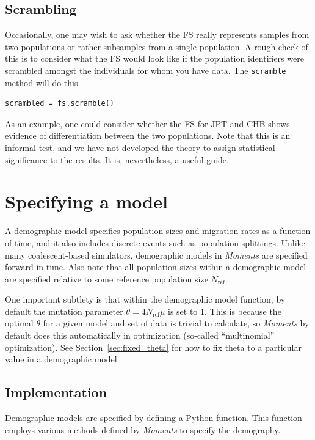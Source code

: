 \documentclass[12pt]{article}
\makeatletter
\newcommand{\Nref}{\ensuremath{N_\text{ref}}\xspace}
\newcommand{\py}[1]{\lstinline[language=Python, showstringspaces=False]@#1@}
\makeatother
\begin{document}
\subsection{Scrambling}

Occasionally, one may wish to ask whether the FS really represents samples from two populations or rather subsamples from a single population.
A rough check of this is to consider what the FS would look like if the population identifiers were scrambled amongst the individuals for whom you have data.
The \py{scramble} method will do this.
\begin{lstlisting}
scrambled = fs.scramble()
\end{lstlisting}
As an example, one could consider whether the FS for JPT and CHB shows evidence of differentiation between the two populations.
Note that this is an informal test, and we have not developed the theory to assign statistical significance to the results.
It is, nevertheless, a useful guide.

\section{Specifying a model}

A demographic model specifies population sizes and migration rates as a function of time, and it also includes discrete events such as population splittings.
Unlike many coalescent-based simulators, demographic models in \textit{Moments} are specified forward in time.
Also note that all population sizes within a demographic model are specified relative to some reference population size \Nref.

One important subtlety is that within the demographic model function, by default the mutation parameter $\theta = 4 \Nref \mu$ is set to 1.
This is because the optimal $\theta$ for a given model and set of data is trivial to calculate, so \textit{Moments} by default does this automatically in optimization (so-called ``multinomial'' optimization).
See Section~\ref{sec:fixed_theta} for how to fix theta to a particular value in a demographic model.

\subsection{Implementation}

Demographic models are specified by defining a Python function.
This function employs various methods defined by \textit{Moments} to specify the demography.
\end{document}
